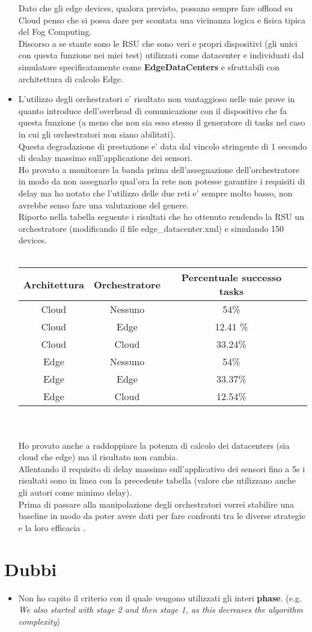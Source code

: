 \documentclass[12pt, a4paper]{report} %
\begin{document}
\begin{itemize}
 	Dato che gli edge devices, qualora previsto, possano sempre fare offload su Cloud penso che si possa dare per scontata una vicinanza logica e fisica tipica del Fog Computing.\\
 	Discorso a se stante sono le RSU che sono veri e propri dispositivi (gli unici con questa funzione nei miei test) utilizzati come datacenter e individuati dal simulatore specificatamente come \textbf{EdgeDataCenters} e sfruttabili con architettura di calcolo Edge.
 	\item L'utilizzo degli orchestratori e' risultato non vantaggioso nelle mie prove in quanto introduce dell'overhead di comunicazione con il dispositivo che fa questa funzione (a meno che non sia esso stesso il generatore di tasks nel caso in cui gli orchestratori non siano abilitati).\\
	Questa degradazione di prestazione e' data dal vincolo stringente di 1 secondo di dealay massimo sull'applicazione dei sensori.\\
	Ho provato a monitorare la banda prima dell'assegnazione dell'orchestratore in modo da non assegnarlo qual'ora la rete non potesse garantire i requisiti di delay ma ho notato che l'utilizzo delle due reti e' sempre molto basso, non avrebbe senso fare una valutazione del genere.\\
	Riporto nella tabella seguente i risultati che ho ottenuto rendendo la RSU un orchestratore (modificando il file edge\_datacenter.xml) e simulando 150 devices.\\
	\\
 	\begin{tabular}{| c | c | c || c ||} %
		\hline
		Architettura & Orchestratore & Percentuale successo tasks\\ [1ex] 
		\hline
		\hline
		Cloud & Nessuno & 54\%\\
		\hline
		Cloud & Edge & 12.41 \%\\
		\hline
		Cloud & Cloud & 33.24\%\\
		\hline
		Edge & Nessuno & 54\%\\
		\hline
		Edge & Edge & 33.37\%\\
		\hline
		Edge & Cloud & 12.54\%\\
		\hline
\end{tabular}
	\\
	\\
	Ho provato anche a raddoppiare la potenza di calcolo dei datacenters (sia cloud che edge) ma il risultato non cambia.
	\\
	Allentando il requisito di delay massimo sull'applicativo dei sensori fino a 5s i risultati sono in linea con la precedente tabella (valore che utilizzano anche gli autori come minimo delay).\\
Prima di passare alla manipolazione degli orchestratori vorrei stabilire una baseline in modo da poter avere dati per fare confronti tra le diverse strategie e la loro efficacia .

\end{itemize}
\section*{Dubbi}
\begin{itemize}
	\item Non ho capito il criterio con il quale vengono utilizzati gli interi \textbf{phase}. (e.g. \textit{We also started with stage 2 and then stage 1, as this decreases the algorithm complexity})
\end{itemize}
\end{document}
